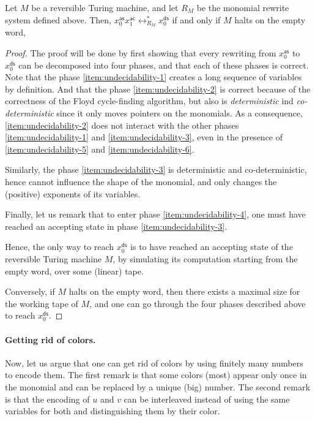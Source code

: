 \begin{lemma}
  \label{lem:undecidability}
  Let $M$ be a reversible Turing machine, and let $R_M$ be the monomial rewrite
  system defined above. Then, 
  $x_0^{\mathsf{as}} x_1^{\mathsf{ac}} \leftrightarrow_{R_M}^* x_0^{\mathsf{ds}}$ if and only if
  $M$ halts on the empty word,
\end{lemma}
\begin{proof}

  The proof will be done by first showing that every rewriting from
  $x_0^{\mathsf{as}}$ to $x_0^{\mathsf{ds}}$ can be decomposed into four
  phases, and that each of these phases is correct. Note that the phase
  \ref{item:undecidability-1} creates a long sequence of variables by
  definition. And that the phase \ref{item:undecidability-2} is correct because
  of the correctness of the Floyd cycle-finding algorithm, but also is
  \emph{deterministic} ind \emph{co-deterministic} since it only moves pointers
  on the monomials. As a consequence, \ref{item:undecidability-2} does not
  interact with the other phases \ref{item:undecidability-1} and
  \ref{item:undecidability-3}, even in the presence of
  \ref{item:undecidability-5} and \ref{item:undecidability-6}.

  Similarly, the phase \ref{item:undecidability-3} is deterministic and
  co-deterministic, hence cannot influence the shape of the monomial,
  and only changes the (positive) exponents of its variables.

  Finally, let us remark that to enter phase \ref{item:undecidability-4}, one
  must have reached an accepting state in phase \ref{item:undecidability-3}.

  Hence, the only way to reach $x_0^{\mathsf{ds}}$ is to have reached an accepting
  state of the reversible Turing machine $M$, by simulating its computation
  starting from the empty word, over some (linear) tape.

  Conversely, if $M$ halts on the empty word, then there exists a maximal
  size for the working tape of $M$, and one can go through the four phases
  described above to reach $x_0^{\mathsf{ds}}$.
\end{proof}

\paragraph{Getting rid of colors.}
Now, let us argue that one can get rid of colors by using 
finitely many numbers to encode them. 
The first remark is that some colors (most) appear only once 
in the monomial and can be replaced by a unique (big) number.
The second remark is that the encoding of $u$ and $v$ can be interleaved
instead of using the same variables for both and distinguishing them
by their color. 





